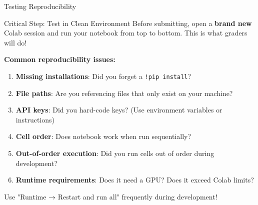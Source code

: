 \documentclass[aspectratio=169]{beamer}
\begin{document}
\begin{frame}[shrink=10]{Testing Reproducibility 🔄}
\begin{alertblock}{Critical Step: Test in Clean Environment}
Before submitting, open a \textbf{brand new} Colab session and run your notebook from top to bottom. This is what graders will do!
\end{alertblock}

\vspace{0.3cm}

\textbf{Common reproducibility issues:}
\begin{enumerate}\setlength{\itemsep}{0pt}
    \item \textbf{Missing installations}: Did you forget a \texttt{!pip install}?
    \item \textbf{File paths}: Are you referencing files that only exist on your machine?
    \item \textbf{API keys}: Did you hard-code keys? (Use environment variables or instructions)
    \item \textbf{Cell order}: Does notebook work when run sequentially?
    \item \textbf{Out-of-order execution}: Did you run cells out of order during development?
    \item \textbf{Runtime requirements}: Does it need a GPU? Does it exceed Colab limits?
\end{enumerate}

\vspace{0.3cm}

\begin{protip}
Use "Runtime → Restart and run all" frequently during development!
\end{protip}
\end{frame}
\end{document}
